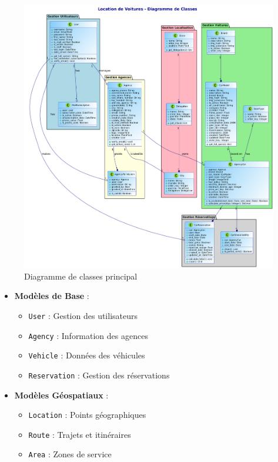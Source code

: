\begin{figure}[h!]
    \centering
    \includegraphics[width=1\textwidth]{docs/rapport/class.png}
    \caption{Diagramme de classes principal}
    \label{fig:class_diagram}
\end{figure}

\begin{itemize}
    \item \textbf{Modèles de Base} :
    \begin{itemize}
        \item \texttt{User} : Gestion des utilisateurs
        \item \texttt{Agency} : Information des agences
        \item \texttt{Vehicle} : Données des véhicules
        \item \texttt{Reservation} : Gestion des réservations
    \end{itemize}
    
    \item \textbf{Modèles Géospatiaux} :
    \begin{itemize}
        \item \texttt{Location} : Points géographiques
        \item \texttt{Route} : Trajets et itinéraires
        \item \texttt{Area} : Zones de service
    \end{itemize}
\end{itemize}

